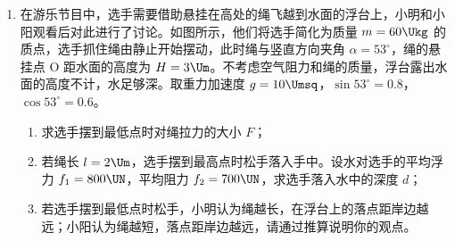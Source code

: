 \documentclass[\gkver]{gaokaozhenti}
\begin{document}
\begin{enumerate}
{\begin{enumerate}
	\item
	$\frac{I^{2}R}{mg}$

	\item
	$\frac{mg\sqrt{2gh}}{IR}$
\end{enumerate}
}

\item
在游乐节目中，选手需要借助悬挂在高处的绳飞越到水面的浮台上，小明和小阳观看后对此进行了讨论。如图所示，他们将选手简化为质量 $m=60\Ukg$ 的质点，选手抓住绳由静止开始摆动，此时绳与竖直方向夹角 $\alpha=53^{\circ}$，绳的悬挂点 O 距水面的高度为 $H=3\Um$。不考虑空气阻力和绳的质量，浮台露出水面的高度不计，水足够深。取重力加速度 $g=10\Umsq$，$\sin53^{\circ}=0.8$，$\cos53^{\circ}=0.6$。
\begin{enumerate}
	\item
	求选手摆到最低点时对绳拉力的大小 $F$；
	\item
	若绳长 $l=2\Um$，选手摆到最高点时松手落入手中。设水对选手的平均浮力 $f_{1}=800\UN$，平均阻力 $f_{2}=700\UN$，求选手落入水中的深度 $d$；
	\item
	若选手摆到最低点时松手，小明认为绳越长，在浮台上的落点距岸边越远；小阳认为绳越短，落点距岸边越远，请通过推算说明你的观点。
\end{enumerate}


\jdanswer{
\begin{enumerate}
	\item
	$1080\UN$


\end{enumerate}}
\end{enumerate}
\end{document}
